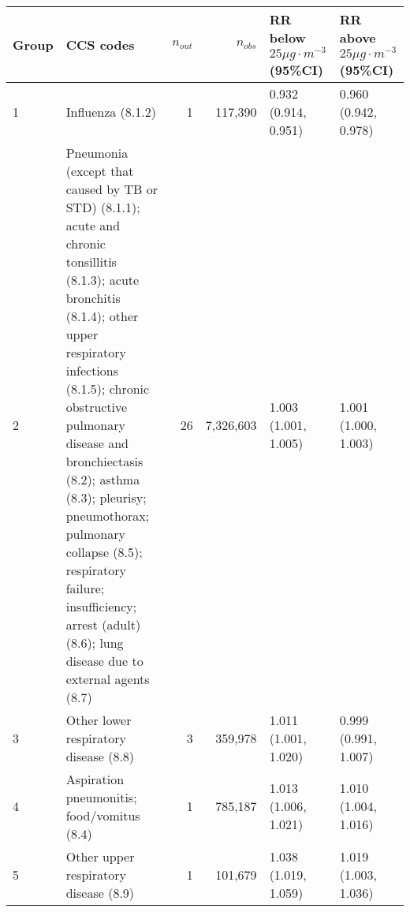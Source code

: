 \begin{tabular}{lp{6.5cm}rrp{2.2cm}p{2.2cm}}
  \hline
Group & CCS codes & $n_{out}$ & $n_{obs}$ & RR below $25 \mu g \cdot m^{-3}$ (95\%CI) & RR above $25 \mu g \cdot m^{-3}$ (95\%CI) \\ 
  \hline
   1 & Influenza (8.1.2) &    1 & 117,390 & 0.932 (0.914, 0.951) & 0.960 (0.942, 0.978) \\ 
     2 & Pneumonia (except that caused by TB or STD) (8.1.1); acute and chronic tonsillitis (8.1.3); acute bronchitis (8.1.4); other upper respiratory infections (8.1.5); chronic obstructive pulmonary disease and bronchiectasis (8.2); asthma (8.3); pleurisy; pneumothorax; pulmonary collapse (8.5); respiratory failure; insufficiency; arrest (adult) (8.6); lung disease due to external agents (8.7) &   26 & 7,326,603 & 1.003 (1.001, 1.005) & 1.001 (1.000, 1.003) \\ 
     3 & Other lower respiratory disease (8.8) &    3 & 359,978 & 1.011 (1.001, 1.020) & 0.999 (0.991, 1.007) \\ 
     4 & Aspiration pneumonitis; food/vomitus (8.4) &    1 & 785,187 & 1.013 (1.006, 1.021) & 1.010 (1.004, 1.016) \\ 
     5 & Other upper respiratory disease (8.9) &    1 & 101,679 & 1.038 (1.019, 1.059) & 1.019 (1.003, 1.036) \\ 
   \hline
\end{tabular}

